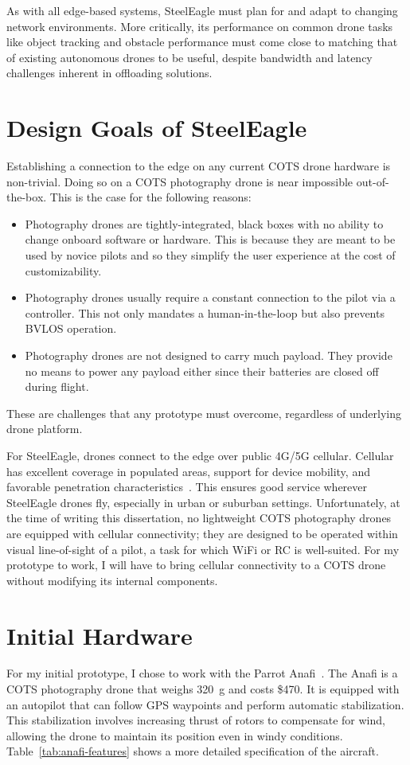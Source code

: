 As with all edge-based systems, SteelEagle must plan for and adapt to changing network environments. More critically, its performance on common drone tasks like object tracking and obstacle performance must come close to matching that of existing autonomous drones to be useful, despite bandwidth and latency challenges inherent in offloading solutions.

\section{Design Goals of SteelEagle}
Establishing a connection to the edge on any current COTS drone hardware is non-trivial. Doing so on a COTS photography drone is near impossible out-of-the-box. This is the case for the following reasons:
\begin{itemize}
    \item Photography drones are tightly-integrated, black boxes with no ability to change onboard software or hardware. This is because they are meant to be used by novice pilots and so they simplify the user experience at the cost of customizability.
    \item Photography drones usually require a constant connection to the pilot via a controller. This not only mandates a human-in-the-loop but also prevents BVLOS operation.
    \item Photography drones are not designed to carry much payload. They provide no means to power any payload either since their batteries are closed off during flight.
\end{itemize}
These are challenges that any prototype must overcome, regardless of underlying drone platform.

For SteelEagle, drones connect to the edge over public 4G/5G cellular. Cellular has excellent coverage in populated areas, support for device mobility, and favorable penetration characteristics~\cite{FCC}. This ensures good service wherever SteelEagle drones fly, especially in urban or suburban settings. Unfortunately, at the time of writing this dissertation, no lightweight COTS photography drones are equipped with cellular connectivity; they are designed to be operated within visual line-of-sight of a pilot, a task for which WiFi or RC is well-suited. For my prototype to work, I will have to bring cellular connectivity to a COTS drone without modifying its internal components.

\section{Initial Hardware}
\label{sec:init-hardware}
For my initial prototype, I chose to work with the Parrot Anafi~\cite{ParrotAnafi}. The Anafi is a COTS photography drone that weighs 320~g and costs \$470. It is equipped with an autopilot that can follow GPS waypoints and perform automatic stabilization. This stabilization involves increasing thrust of rotors to compensate for wind, allowing the drone to maintain its position even in windy conditions. Table~\ref{tab:anafi-features} shows a more detailed specification of the aircraft.

